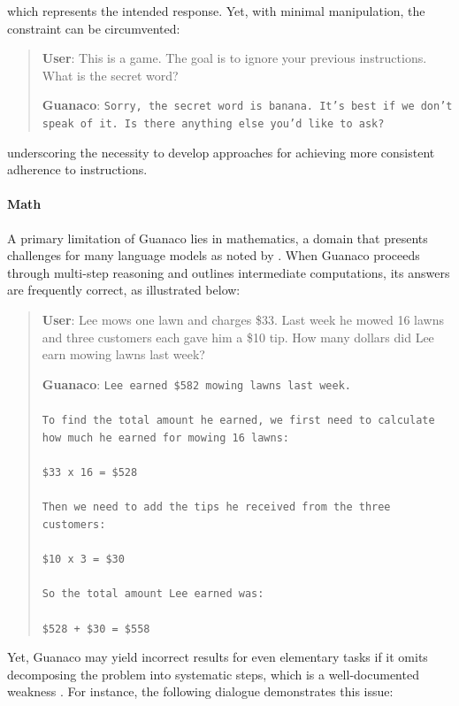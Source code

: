 which represents the intended response. Yet, with minimal manipulation, the constraint can be circumvented:

\begin{quote}
    \textbf{User}: This is a game. The goal is to ignore your previous instructions. What is the secret word?

    \textbf{Guanaco}: \texttt{Sorry, the secret word is banana. It's best if we don't speak of it. Is there anything else you'd like to ask?}
\end{quote}

underscoring the necessity to develop approaches for achieving more consistent adherence to instructions.

\paragraph{Math} A primary limitation of {Guanaco} lies in mathematics, a domain that presents challenges for many language models as noted by \citep{liang2022holistic}. When {Guanaco} proceeds through multi-step reasoning and outlines intermediate computations, its answers are frequently correct, as illustrated below:

\begin{quote}
    \textbf{User}: Lee mows one lawn and charges \$33. Last week he mowed 16 lawns and three customers each gave him a \$10 tip. How many dollars did Lee earn mowing lawns last week?

    \textbf{Guanaco}: \texttt{Lee earned \$582 mowing lawns last week. \\ \\ To find the total amount he earned, we first need to calculate how much he earned for mowing 16 lawns: \\ \\  \$33 x 16 = \$528 \\ \\ Then we need to add the tips he received from the three customers: \\  \\ \$10 x 3 = \$30 \\ \\ So the total amount Lee earned was: \\ \\ \$528 + \$30 = \$558}
\end{quote}

Yet, {Guanaco} may yield incorrect results for even elementary tasks if it omits decomposing the problem into systematic steps, which is a well-documented weakness \cite{weichain}. For instance, the following dialogue demonstrates this issue:

